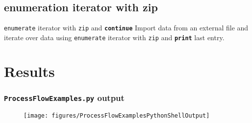 \documentclass[t]{beamer}
\begin{document}
\subsection{enumeration iterator with zip}
\begin{frame}{\texttt{enumerate} iterator with \texttt{zip} and \texttt{\textbf{continue}}}
\small{Import data from an external file and iterate over data using \texttt{enumerate} iterator with \texttt{zip} and \texttt{\textbf{print}}  last entry.}
  \begin{figure}[ht]
  \centering
        \lstset{numbers=left}
        
        
   \end{figure}
\end{frame}

\section{Results}
\begin{frame}[fragile]
\frametitle{\texttt{ProcessFlowExamples.py} output}
  \begin{figure}[ht]
  \centering
        \texttt{[image: figures/ProcessFlowExamplesPythonShellOutput]}
   \end{figure}
\end{frame}
\end{document}
